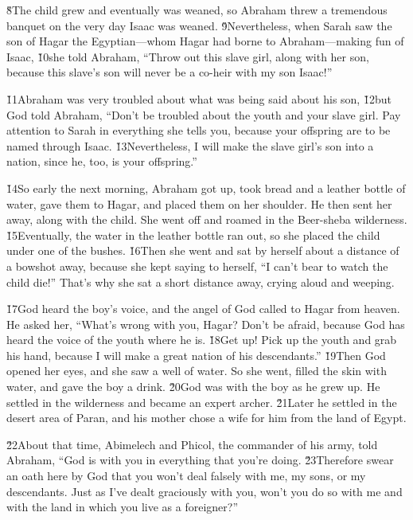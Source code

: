 \v{8}The child grew and eventually was weaned, so Abraham threw a tremendous banquet on the very day Isaac was weaned. \v{9}Nevertheless, when Sarah saw the son of Hagar the Egyptian---whom Hagar had borne to Abraham---making fun of Isaac, \v{10}she told Abraham, ``Throw out this slave girl, along with her son, because this slave's son will never be a co-heir with my son Isaac!''

\v{11}Abraham was very troubled about what was being said about his son, \v{12}but God told Abraham, ``Don't be troubled about the youth and your slave girl. Pay attention to Sarah in everything she tells you, because your offspring are to be named through Isaac. \v{13}Nevertheless, I will make the slave girl's son into a nation, since he, too, is your offspring.''

\v{14}So early the next morning, Abraham got up, took bread and a leather bottle of water, gave them to Hagar, and placed them on her shoulder. He then sent her away, along with the child. She went off and roamed in the Beer-sheba wilderness. \v{15}Eventually, the water in the leather bottle ran out, so she placed the child under one of the bushes. \v{16}Then she went and sat by herself about a distance of a bowshot away, because she kept saying to herself, ``I can't bear to watch the child die!'' That's why she sat a short distance away, crying aloud and weeping.

\v{17}God heard the boy's voice, and the angel of God called to Hagar from heaven. He asked her, ``What's wrong with you, Hagar? Don't be afraid, because God has heard the voice of the youth where he is. \v{18}Get up! Pick up the youth and grab his hand, because I will make a great nation of his descendants.'' \v{19}Then God opened her eyes, and she saw a well of water. So she went, filled the skin with water, and gave the boy a drink. \v{20}God was with the boy as he grew up. He settled in the wilderness and became an expert archer. \v{21}Later he settled in the desert area of Paran, and his mother chose a wife for him from the land of Egypt.

\v{22}About that time, Abimelech and Phicol, the commander of his army, told Abraham, ``God is with you in everything that you're doing. \v{23}Therefore swear an oath here by God that you won't deal falsely with me, my sons, or my descendants. Just as I've dealt graciously with you, won't you do so with me and with the land in which you live as a foreigner?''

